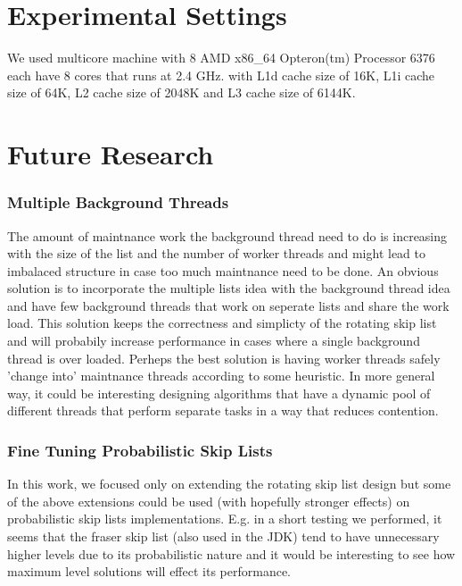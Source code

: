 \documentclass{article}
\begin{document}
\section{Experimental Settings}
\label{sec:exp}

We used multicore machine with 8 AMD x86\_64 Opteron(tm) Processor 6376 each have 8 cores that runs at 2.4 GHz. with L1d cache size of 16K, L1i cache size of 64K, L2 cache size of 2048K and L3 cache size of 6144K.

\section{Future Research}
\label{sec:foot}

\subsubsection{Multiple Background Threads}
\label{sssec:fr-1}
The amount of maintnance work the background thread need to do is increasing with the size of the list and the number of worker threads and might lead to imbalaced structure in case too much maintnance need to be done. An obvious solution is to incorporate the multiple lists idea with the background thread idea and have few background threads that work on seperate lists and share the work load. This solution keeps the correctness and simplicty of the rotating skip list and will probabily increase performance in cases where a single background thread is over loaded. Perheps the best solution is having worker threads safely 'change into' maintnance threads according to some heuristic. In more general way, it could be interesting designing algorithms that have a dynamic pool of different threads that perform separate tasks in a way that reduces contention.

\subsubsection{Fine Tuning Probabilistic Skip Lists}
\label{sssec:fr-2}

In this work, we focused only on extending the rotating skip list design but some of the above extensions could be used (with hopefully stronger effects) on probabilistic skip lists implementations. E.g. in a short testing we performed, it seems that the fraser skip list (also used in the JDK) tend to have unnecessary higher levels due to its probabilistic nature and it would be interesting to see how maximum level solutions will effect its performance.
\end{document}
